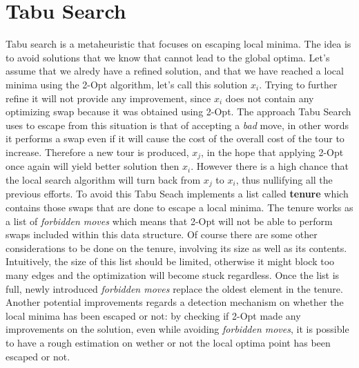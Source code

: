 \section{Tabu Search}
Tabu search is a metaheuristic that focuses on escaping local minima.
The idea is to avoid solutions that we know that cannot lead to the global optima.
Let's assume that we alredy have a refined solution, and that we have reached a local minima using the 2-Opt algorithm, let's call this solution $x_i$. 
Trying to further refine it will not provide any improvement, since $x_i$ does not contain any optimizing swap because it was obtained using 2-Opt.
The approach Tabu Search uses to escape from this situation is that of accepting a \textit{bad} move, in other words it performs a swap even if it will cause the cost of the overall cost of the tour to increase.
Therefore a new tour is produced, $x_j$, in the hope that applying 2-Opt once again will yield better solution then $x_i$.
However there is a high chance that the local search algorithm will turn back from $x_j$ to $x_i$, thus nullifying all the previous efforts.
To avoid this Tabu Seach implements a list called \textbf{tenure} which contains those swaps that are done to escape a local minima.
The tenure works as a list of \textit{forbidden moves} which means that 2-Opt will not be able to perform swaps included within this data structure.
Of course there are some other considerations to be done on the tenure, involving its size as well as its contents.
Intuitively, the size of this list should be limited, otherwise it might block too many edges and the optimization will become stuck regardless.
Once the list is full, newly introduced \textit{forbidden moves} replace the oldest element in the tenure. 
Another potential improvements regards a detection mechanism on whether the local minima has been escaped or not: by checking if 2-Opt made any improvements on the solution, even while avoiding \textit{forbidden moves}, it is possible to have a rough estimation on wether or not the local optima point has been escaped or not.
